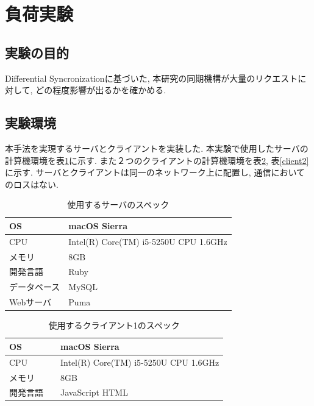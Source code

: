 \section{負荷実験}
\subsection{実験の目的}
Differential Syncronizationに基づいた, 本研究の同期機構が大量のリクエストに対して, どの程度影響が出るかを確かめる.
\subsection{実験環境}
本手法を実現するサーバとクライアントを実装した. 本実験で使用したサーバの計算機環境を表\ref{server}に示す. また２つのクライアントの計算機環境を表\ref{client1}, 表\ref{client2}に示す. サーバとクライアントは同一のネットワーク上に配置し, 通信においてのロスはない.
\begin{table}[]
\begin{center}
	\caption{使用するサーバのスペック}
	\begin{tabular}{|l|l|} \hline
		OS &  macOS Sierra　\\ \hline
		CPU & Intel(R) Core(TM) i5-5250U CPU 1.6GHz \\ \hline
		メモリ & 8GB \\ \hline
    開発言語　& Ruby \\ \hline
		データベース & MySQL \\ \hline
		Webサーバ & Puma\\ \hline
	\end{tabular}
	\label{server}
\end{center}
\end{table}

\begin{table}[]
\begin{center}
	\caption{使用するクライアント1のスペック}
	\begin{tabular}{|l|l|} \hline
		OS & macOS Sierra \\ \hline
		CPU & Intel(R) Core(TM) i5-5250U CPU 1.6GHz \\ \hline
		メモリ & 8GB \\ \hline
    開発言語　& JavaScript HTML \\ \hline
	\end{tabular}
	\label{client1}
\end{center}
\end{table}


